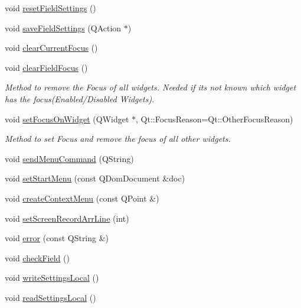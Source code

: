 \begin{DoxyCompactItemize}
\item 
void \hyperlink{classFglForm_a1d7dad289a4b04321a2c932adf12d19b}{resetFieldSettings} ()
\item 
void \hyperlink{classFglForm_a3d7ccbba13b950e970333db68755d022}{saveFieldSettings} (QAction $\ast$)
\item 
void \hyperlink{classFglForm_a4430f1038e2dcfd957c1d361d0c286d4}{clearCurrentFocus} ()
\item 
void \hyperlink{classFglForm_ae2815f84a3c114c000f97cc0cf431bb7}{clearFieldFocus} ()
\begin{DoxyCompactList}\small\item\em Method to remove the Focus of all widgets. Needed if its not known which widget has the focus(Enabled/Disabled Widgets). \item\end{DoxyCompactList}\item 
void \hyperlink{classFglForm_abacf589f219bcfbcf54ca2a5fb9ba859}{setFocusOnWidget} (QWidget $\ast$, Qt::FocusReason=Qt::OtherFocusReason)
\begin{DoxyCompactList}\small\item\em Method to set Focus and remove the focus of all other widgets. \item\end{DoxyCompactList}\item 
void \hyperlink{classFglForm_a5e7fe57471d1f3ad4d6dbf7ac1c8b843}{sendMenuCommand} (QString)
\item 
void \hyperlink{classFglForm_af3d272e5dc101746b728bdd457d42a6f}{setStartMenu} (const QDomDocument \&doc)
\item 
void \hyperlink{classFglForm_af07f7257121ab71b9a53ccb2fd1a9fe3}{createContextMenu} (const QPoint \&)
\item 
void \hyperlink{classFglForm_afce8d989187c85d7bde751824a9b6c6a}{setScreenRecordArrLine} (int)
\item 
void \hyperlink{classFglForm_a3d2c6f2a3a0e1828ff1f43d4d93fa775}{error} (const QString \&)
\item 
void \hyperlink{classFglForm_a95fd29ee66dc40bb56d6bb94593feddd}{checkField} ()
\item 
void \hyperlink{classFglForm_a4fdd15cf1295a7d04b378e5c4cb2d877}{writeSettingsLocal} ()
\item 
void \hyperlink{classFglForm_ae9f393760ac910dd86de0919be07f41c}{readSettingsLocal} ()
\end{DoxyCompactItemize}
